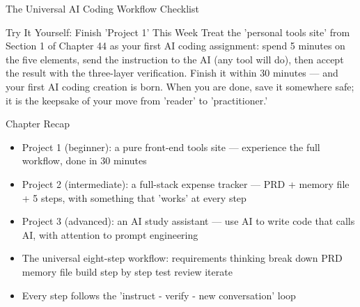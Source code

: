 \begin{center}\small\color{gray}The Universal AI Coding Workflow Checklist\end{center}

\begin{tcbpractice}{Try It Yourself: Finish 'Project 1' This Week}
Treat the 'personal tools site' from Section 1 of Chapter 44 as your first AI coding assignment: spend 5 minutes on the five elements, send the instruction to the AI (any tool will do), then accept the result with the three-layer verification. Finish it within 30 minutes — and your first AI coding creation is born. When you are done, save it somewhere safe; it is the keepsake of your move from 'reader' to 'practitioner.'

\end{tcbpractice}

\begin{tcbsummary}{Chapter Recap}
\begin{itemize}
  \item Project 1 (beginner): a pure front-end tools site — experience the full workflow, done in 30 minutes
  \item Project 2 (intermediate): a full-stack expense tracker — PRD + memory file + 5 steps, with something that 'works' at every step
  \item Project 3 (advanced): an AI study assistant — use AI to write code that calls AI, with attention to prompt engineering
  \item The universal eight-step workflow: requirements thinking break down PRD memory file build step by step test review iterate
  \item Every step follows the 'instruct - verify - new conversation' loop
\end{itemize}

\end{tcbsummary}
